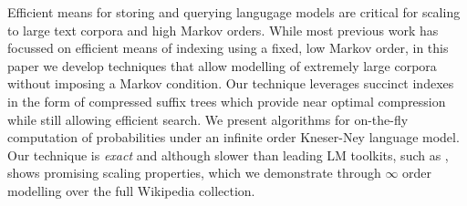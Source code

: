 Efficient means for storing and querying langugage models are critical for scaling  to large text corpora and high Markov orders.
While most previous work has focussed on efficient means of indexing \ngrams using a fixed, low Markov order,
in this paper we develop techniques that allow modelling of extremely large corpora without imposing a Markov condition.
Our technique leverages succinct indexes in the form of compressed suffix trees which provide near optimal compression while still allowing efficient search.
We present algorithms for on-the-fly computation of probabilities under an infinite order Kneser-Ney language model.
Our technique is \emph{exact} and although slower than leading LM toolkits, such as \SRILM, shows promising scaling properties, which we demonstrate through $\infty$ order modelling over the full Wikipedia collection. 




%
%
